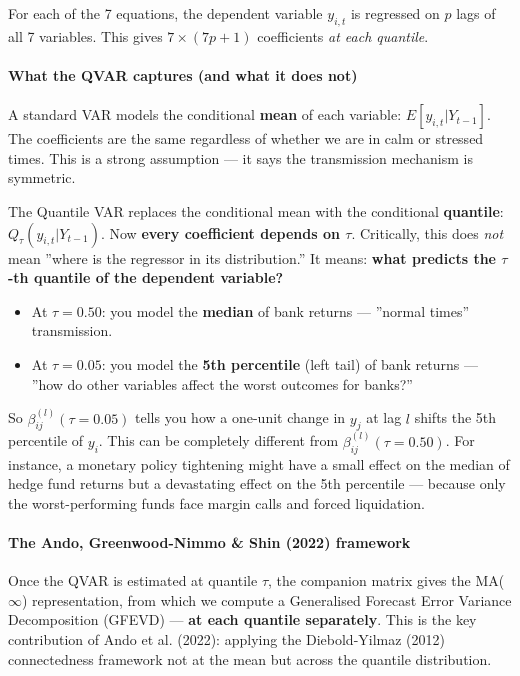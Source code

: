 \documentclass[11pt,a4paper]{article}
\begin{document}
For each of the 7 equations, the dependent variable $y_{i,t}$ is regressed on $p$ lags of all 7 variables. This gives $7 \times (7p + 1)$ coefficients \textit{at each quantile}.


\paragraph{What the QVAR captures (and what it does not)}

A standard VAR models the conditional \textbf{mean} of each variable: $E[y_{i,t} | Y_{t-1}]$. The coefficients are the same regardless of whether we are in calm or stressed times. This is a strong assumption --- it says the transmission mechanism is symmetric.

The Quantile VAR replaces the conditional mean with the conditional \textbf{quantile}: $Q_\tau(y_{i,t} | Y_{t-1})$. Now \textbf{every coefficient depends on $\tau$}. Critically, this does \textit{not} mean ''where is the regressor in its distribution.'' It means: \textbf{what predicts the $\tau$-th quantile of the dependent variable?}

\begin{itemize}
\item At $\tau = 0.50$: you model the \textbf{median} of bank returns --- ''normal times'' transmission.
\item At $\tau = 0.05$: you model the \textbf{5th percentile} (left tail) of bank returns --- ''how do other variables affect the worst outcomes for banks?''

\end{itemize}
So $\beta_{ij}^{(l)}(\tau = 0.05)$ tells you how a one-unit change in $y_j$ at lag $l$ shifts the 5th percentile of $y_i$. This can be completely different from $\beta_{ij}^{(l)}(\tau = 0.50)$. For instance, a monetary policy tightening might have a small effect on the median of hedge fund returns but a devastating effect on the 5th percentile --- because only the worst-performing funds face margin calls and forced liquidation.


\paragraph{The Ando, Greenwood-Nimmo \& Shin (2022) framework}

Once the QVAR is estimated at quantile $\tau$, the companion matrix gives the MA($\infty$) representation, from which we compute a Generalised Forecast Error Variance Decomposition (GFEVD) --- \textbf{at each quantile separately}. This is the key contribution of Ando et al. (2022): applying the Diebold-Yilmaz (2012) connectedness framework not at the mean but across the quantile distribution.
\end{document}
